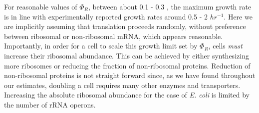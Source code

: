 For reasonable values of $\Phi_R$, between about 0.1 - 0.3 \citep{scott2010},
the maximum growth rate is in line with experimentally reported growth rates
around 0.5 - 2 $hr^{-1}$. Here we are implicitly assuming that translation
proceeds randomly, without preference between ribosomal or non-ribosomal mRNA,
which appears reasonable. Importantly, in order for a cell to scale this growth
limit set by $\Phi_R$, cells \textit{must} increase their ribosomal abundance.
This can be achieved by either synthesizing more ribosomes or reducing the
fraction of non-ribosomal proteins. Reduction of non-ribosomal proteins is not
straight forward since, as we have found throughout our estimates, doubling a
cell requires many other enzymes and transporters. Increasing the absolute
ribosomal abundance for the case of \textit{E. coli} is limited by the number of
rRNA operons.


